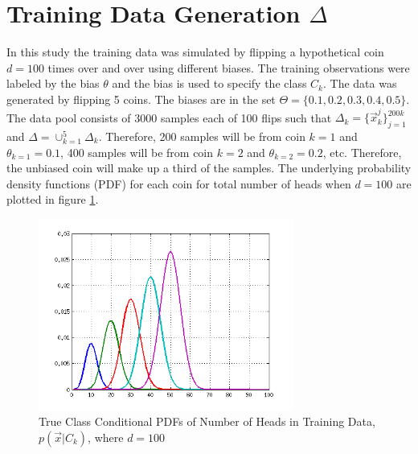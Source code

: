 \documentclass[journal]{IEEEtran}
\begin{document}
\section{Training Data Generation  \(\Delta\)}
\par In this study the training data was simulated by flipping a hypothetical coin \(d=100\) times over and over using different biases. The training observations were labeled by the bias \(\theta\) and the bias is used to specify the class \(C_k\).  The data was generated by flipping 5 coins. The biases are in the set \(\Theta = \{0.1, 0.2, 0.3, 0.4, 0.5\}\). The data pool consists of 3000 samples each of 100 flips such that \(\Delta_k = \{\vec{x}_k^j\}_{j=1}^{200k}\) and \(\Delta = \cup_{k=1}^5{\Delta_k}\). Therefore, 200 samples will be from coin \(k=1\) and \(\theta_{k=1} = 0.1\), 400 samples will be from coin \(k=2\) and \(\theta_{k=2} = 0.2\), etc. Therefore, the unbiased coin will make up a third of the samples. The underlying probability density functions (PDF) for each coin for total number of heads when \(d=100\) are plotted in figure \ref{fig:distros_100}.

\begin{figure}
\centering
\includegraphics[width=3.3in]{../images/distros_100.png}
\caption{True Class Conditional PDFs of Number of Heads in Training Data, \(p(\vec{x}\vert C_k)\), where \(d=100\)}
\label{fig:distros_100}
\end{figure}
\end{document}
